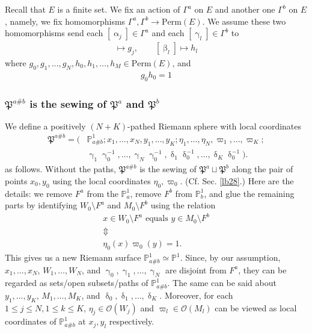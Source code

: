 \documentclass[12pt,a4paper,notitlepage]{article}
\theoremstyle{definition}
\theoremstyle{plain}
\newcommand{\fk}{\mathfrak}
\newcommand{\scr}{\mathscr}
\newcommand{\Pbb}{\mathbb P}
\newcommand{\Perm}{\mathrm{Perm}}
\numberwithin{equation}{subsection}
\begin{document}
Recall that $E$ is a finite set.  We fix an action of $\Gamma^a$ on $E$ and another one $\Gamma^b$ on $E$, namely, we fix homomorphisms $\Gamma^a,\Gamma^b\rightarrow\Perm(E)$. We assume these two homomorphisms send each $[\upalpha_j]\in\Gamma^a$ and each $[\upgamma_l]\in\Gamma^b$ to
\begin{align*}
[\upalpha_j]\mapsto g_j,\qquad [\upbeta_l]\mapsto h_l	
\end{align*}
where $g_0,g_1,\dots,g_N,h_0,h_1,\dots,h_M\in\Perm(E)$, and 
\begin{align}\label{eq55}
\boxed{~g_0h_0=1~}
\end{align}


\subsubsection{$\fk P^{a\#b}$ is the sewing of $\fk P^a$ and $\fk P^b$}\label{lb60}

We define a positively $(N+K)$-pathed Riemann sphere with local coordinates
\begin{align*}
\fk P^{a\#b}=\big(&\Pbb^1_{a\#b};x_1,\dots,x_N,y_1,\dots,y_K;\eta_1,\dots,\eta_N,\varpi_1,\dots,\varpi_K;\nonumber\\
&\upgamma_1\upgamma_0^{-1},\dots,\upgamma_N\upgamma_0^{-1},\updelta_1\updelta_0^{-1},\dots,\updelta_K\updelta_0^{-1}\big).	
\end{align*}
as follows. Without the paths, $\fk P^{a\#b}$ is the sewing of $\fk P^a\sqcup\fk P^b$ along the pair of points $x_0,y_0$ using the local coordinates $\eta_0,\varpi_0$. (Cf. Sec. \ref{lb28}.) Here are the details: we remove $F^a$ from the $\Pbb^1_a$, remove $F^b$ from $\Pbb^1_b$, and glue the remaining parts by identifying $W_0\setminus F^a$ and $M_0\setminus F^b$ using the relation
\begin{gather*}
x\in W_0\setminus F^a\text{ equals }y\in M_0\setminus F^b\\
\Updownarrow\\
\eta_0(x)\varpi_0(y)=1.
\end{gather*}
This gives us a new Riemann surface $\Pbb^1_{a\#b}\simeq\Pbb^1$. Since, by our assumption, $x_1,\dots,x_N$, $W_1,\dots,W_N$, and $\upgamma_0,\upgamma_1,\dots,\upgamma_N$ are disjoint from $F^a$, they can be regarded as sets/open subsets/paths of $\Pbb^1_{a\#b}$. The same can be said about $y_1,\dots,y_K$, $M_1,\dots,M_K$, and $\updelta_0,\updelta_1,\dots,\updelta_K$. Moreover, for each $1\leq j\leq N,1\leq k\leq K$, $\eta_j\in\scr O(W_j)$ and $\varpi_l\in\scr O(M_l)$ can be viewed as local coordinates of $\Pbb^1_{a\#b}$ at $x_j,y_l$ respectively.
\end{document}
